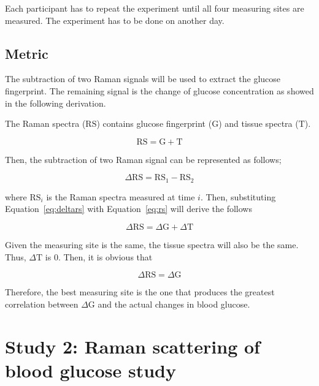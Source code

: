 Each participant has to repeat the experiment until all four measuring sites are measured. 
The experiment has to be done on another day.

\subsection{Metric}

The subtraction of two Raman signals will be used to extract the glucose fingerprint.
The remaining signal is the change of glucose concentration as showed in the following derivation.

The Raman spectra ($\text{RS}$) contains glucose fingerprint ($\text{G}$) and tissue spectra ($\text{T}$).

\begin{equation}\label{eq:rs}
    \text{RS} = \text{G} + \text{T}
\end{equation}

Then, the subtraction of two Raman signal can be represented as follows;

\begin{equation}\label{eq:deltars}
    \Delta \text{RS} = \text{RS}_1 - \text{RS}_2
\end{equation}

where $\text{RS}_i$ is the Raman spectra measured at time $i$. 
Then, substituting Equation~\ref{eq:deltars} with Equation~\ref{eq:rs} will derive the follows

\begin{equation}
    \Delta \text{RS} = \Delta \text{G} + \Delta \text{T}
\end{equation}

Given the measuring site is the same, the tissue spectra will also be the same. 
Thus, $\Delta \text{T}$ is $0$.
Then, it is obvious that 

\begin{equation}
    \Delta \text{RS} = \Delta \text{G}
\end{equation}

Therefore, the best measuring site is the one that produces the greatest correlation between $\Delta \text{G}$ and the actual changes in blood glucose.

\section{Study 2: Raman scattering of blood glucose study}\label{metho-s2}

